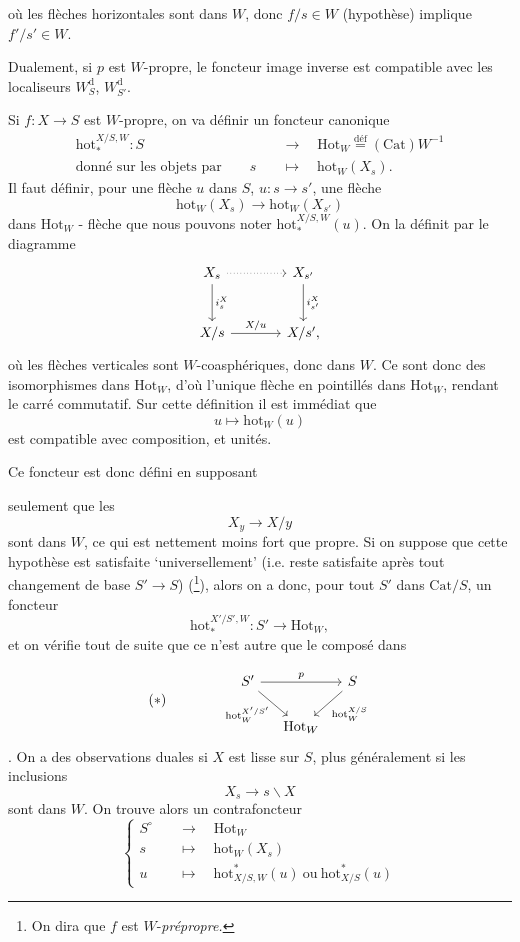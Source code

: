 \documentclass[11pt]{article}
\newcommand{\printedpage}[1]{\marginpar{\footnotesize p.~#1}}
\newcommand{\msp}[1]{\marginpar{\footnotesize [#1]}}
\newcommand{\Cat}{\mathrm{Cat}}
\newcommand{\Hot}{\mathrm{Hot}}
\newcommand{\hot}{\mathrm{hot}}
\begin{document}
\printedpage{26}
où les flèches horizontales sont dans $W$, donc $f/s\in W$ (hypothèse) implique $f'/s'\in W$.

\leavevmode\msp{page 33}Dualement, si $p$ est $W$-propre, le foncteur image inverse est compatible avec les localiseurs $W^{\mathrm{d}}_S$, $W^{\mathrm{d}}_{S'}$.

Si $f : X\longrightarrow S$ est $W$-propre, on va définir un foncteur canonique
\[
\begin{aligned}
\hot_*^{X/S,W} : S &\quad\longrightarrow\quad \Hot_W\overset{\text{déf}}{=}(\Cat)W^{-1}\\
\text{donné sur les objets par}\qquad s &\quad\longmapsto\quad \hot_W(X_s).
\end{aligned}
\]
Il faut définir, pour une flèche $u$ dans $S$, $u : s\longrightarrow s'$, une flèche
\[
\hot_W(X_s)\longrightarrow\hot_W(X_{s'})
\]
dans $\Hot_W$ - flèche que nous pouvons noter $\hot_*^{X/S,W}(u)$. On la définit par le diagramme
\[
\begin{tikzcd}[row sep=large, column sep=large]
X_s \arrow[r, dotted] \arrow[d, "i_s^X"] & X_{s'} \arrow[d, "i_{s'}^X"] \\
X/s \arrow[r, "X/u"] & X/s',
\end{tikzcd}
\]
où les flèches verticales sont $W$-coasphériques, donc dans $W$. Ce sont donc des isomorphismes dans $\Hot_W$, d'où l'unique flèche en pointillés dans $\Hot_W$, rendant le carré commutatif. Sur cette définition il est immédiat que
\[
u\longmapsto\hot_W(u)
\]
est compatible avec composition, et unités.

Ce foncteur est donc défini en supposant

\leavevmode\msp{page 34}seulement que les
\[
X_y\longrightarrow X/y
\]
sont dans $W$, ce qui est nettement moins fort que propre. Si on suppose que cette hypothèse est satisfaite `universellement' (i.e. reste satisfaite après tout changement de base $S'\longrightarrow S$) (\footnote[45]{On dira que $f$ est $W$-\textit{prépropre.}}), alors on a donc, pour tout $S'$ dans $\Cat/S$, un foncteur
\[
\hot_*^{X'/S',W} : S'\longrightarrow\Hot_W,
\]
et on vérifie tout de suite que ce n'est autre que le composé dans

\printedpage{27}
\[
(*)\qquad\qquad
\begin{tikzcd}[column sep=small]
S' \arrow[rr, "p"] \arrow[dr, "\hot_W^{X'/S'}"'] & & S \arrow[dl, "\hot_W^{X/S}"] \\
& \Hot_W &
\end{tikzcd}
\]
. On a des observations duales si $X$ est lisse sur $S$, plus généralement si les inclusions
\[
X_s\longrightarrow s\backslash X
\]
sont dans $W$. On trouve alors un contrafoncteur
\[
\left\{
\begin{aligned}
S^\circ &\quad\longrightarrow\quad \Hot_W\\
s &\quad\longmapsto\quad \hot_W(X_s)\\
u &\quad\longmapsto\quad \hot^*_{X/S,W}(u)\ \text{ou}\ \hot^*_{X/S}(u)
\end{aligned}
\right.
\]
\end{document}
